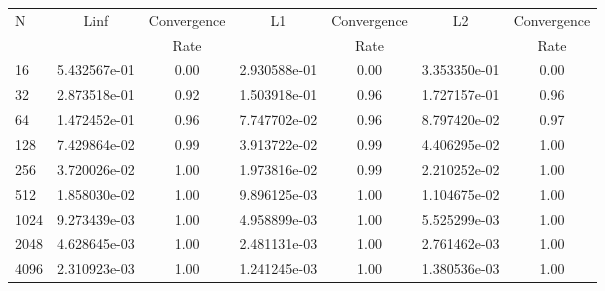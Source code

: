 \documentclass[12pt]{article}
\begin{document}
	\begin{tabular}{l|c|c|c|c|c|c}
		N&Linf&Convergence&L1&Convergence&L2&Convergence\\
		&&Rate&&Rate&&Rate\\
		\hline
		16&5.432567e-01&0.00&2.930588e-01&0.00&3.353350e-01&0.00\\
		\hline
		32&2.873518e-01&0.92&1.503918e-01&0.96&1.727157e-01&0.96\\
		\hline
		64&1.472452e-01&0.96&7.747702e-02&0.96&8.797420e-02&0.97\\
		\hline
		128&7.429864e-02&0.99&3.913722e-02&0.99&4.406295e-02&1.00\\
		\hline
		256&3.720026e-02&1.00&1.973816e-02&0.99&2.210252e-02&1.00\\
		\hline
		512&1.858030e-02&1.00&9.896125e-03&1.00&1.104675e-02&1.00\\
		\hline
		1024&9.273439e-03&1.00&4.958899e-03&1.00&5.525299e-03&1.00\\
		\hline
		2048&4.628645e-03&1.00&2.481131e-03&1.00&2.761462e-03&1.00\\
		\hline
		4096&2.310923e-03&1.00&1.241245e-03&1.00&1.380536e-03&1.00\\
	\end{tabular}
\end{document}
